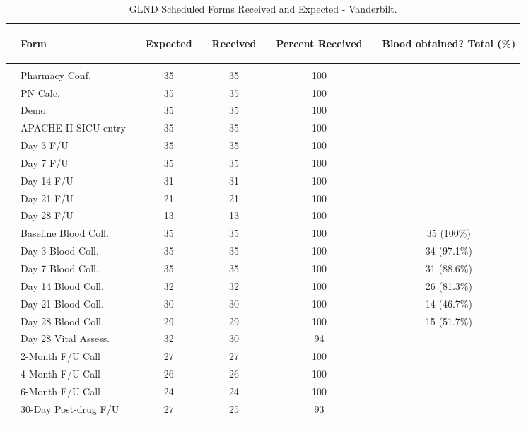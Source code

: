 \documentclass[dvips,10pt]{article}
\begin{document}
\clearpage
\begin{table}[t]
\caption
{ GLND Scheduled Forms Received and Expected - Vanderbilt. }
\begin{center}
\begin{tabular}{ @{}l@{}
@{}l@{}@{}p{1.5em}@{}@{}c@{}@{}p{1.5em}@{}@{}c@{}@{}p{1.5em}@{}@{}c@{}@{}p{1.5em}@{}@{}c@{}
}
\hline

& \parbox{6em}{\begin{center}Form\end{center}} && \parbox{6em}{\begin{center}Expected\end{center}} && \parbox{6em}{\begin{center}Received\end{center}} && \parbox{6em}{\begin{center}Percent Received\end{center}} && \parbox{6em}{\begin{center}Blood obtained? Total (\%)\end{center}} \\

\hline

\\
& Pharmacy Conf. && 35 && 35 && 100 &&  \\
& PN Calc. && 35 && 35 && 100 &&  \\
& Demo. && 35 && 35 && 100 &&  \\
& APACHE II SICU entry && 35 && 35 && 100 &&  \\
& Day 3 F/U && 35 && 35 && 100 &&  \\
& Day 7 F/U && 35 && 35 && 100 &&  \\
& Day 14 F/U && 31 && 31 && 100 &&  \\
& Day 21 F/U && 21 && 21 && 100 &&  \\
& Day 28 F/U && 13 && 13 && 100 &&  \\
& Baseline Blood Coll. && 35 && 35 && 100 && 35 (100\%) \\
& Day 3 Blood Coll. && 35 && 35 && 100 && 34 (97.1\%) \\
& Day 7 Blood Coll. && 35 && 35 && 100 && 31 (88.6\%) \\
& Day 14 Blood Coll. && 32 && 32 && 100 && 26 (81.3\%) \\
& Day 21 Blood Coll. && 30 && 30 && 100 && 14 (46.7\%) \\
& Day 28 Blood Coll. && 29 && 29 && 100 && 15 (51.7\%) \\
& Day 28 Vital Assess. && 32 && 30 && 94 &&  \\
& 2-Month F/U Call && 27 && 27 && 100 &&  \\
& 4-Month F/U Call && 26 && 26 && 100 &&  \\
& 6-Month F/U Call && 24 && 24 && 100 &&  \\
& 30-Day Post-drug F/U && 27 && 25 && 93 &&  \\
\\
\hline \\

\end{tabular}

\end{center}
 \end{table}
\end{document}
